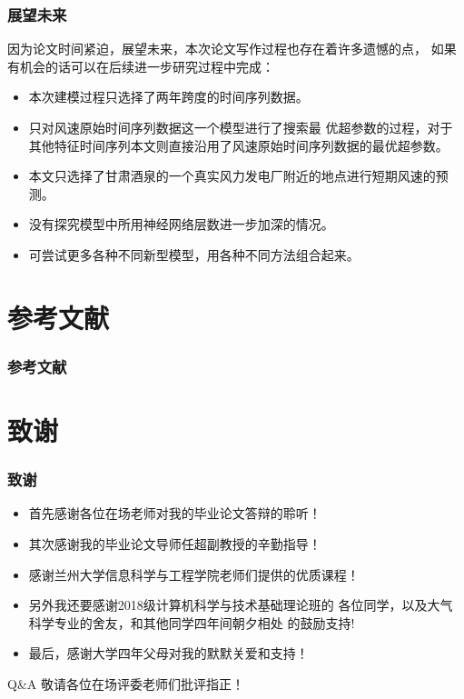 \documentclass[14pt, AutoFakeBold]{ppt}
\begin{document}
\begin{frame}
  \frametitle{展望未来}
  因为论文时间紧迫，展望未来，本次论文写作过程也存在着许多遗憾的点，
  如果有机会的话可以在后续进一步研究过程中完成：
  \begin{itemize}
    \item 本次建模过程只选择了两年跨度的时间序列数据。
    \item 只对风速原始时间序列数据这一个模型进行了搜索最
    优超参数的过程，对于其他特征时间序列本文则直接沿用了风速原始时间序列数据的最优超参数。
    \item 本文只选择了甘肃酒泉的一个真实风力发电厂附近的地点进行短期风速的预测。
    \item 没有探究模型中所用神经网络层数进一步加深的情况。
    \item 可尝试更多各种不同新型模型，用各种不同方法组合起来。
  \end{itemize}
\end{frame}

\section{参考文献}
\begin{frame}[t]
  \frametitle{参考文献}
  
  
  
\end{frame}

\section{致谢}

\begin{frame}
\frametitle{致谢}
  \begin{itemize}
  \item 首先感谢各位在场老师对我的毕业论文答辩的聆听！
  \item 其次感谢我的毕业论文导师任超副教授的辛勤指导！
  \item 感谢兰州大学信息科学与工程学院老师们提供的优质课程！
  \item 另外我还要感谢2018级计算机科学与技术基础理论班的
  各位同学，以及大气科学专业的舍友，和其他同学四年间朝夕相处
  的鼓励支持!
  \item 最后，感谢大学四年父母对我的默默关爱和支持！
  \end{itemize}
  \rightline{}
  \begin{block}{Q\&A}
    敬请各位在场评委老师们批评指正！
  \end{block}
\end{frame}
\end{document}
